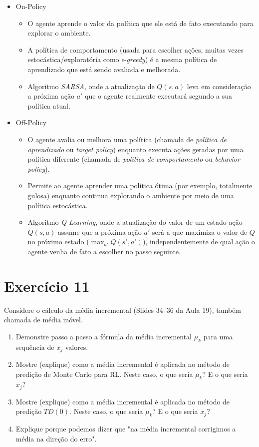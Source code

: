 \documentclass[a4paper,12pt]{article}
\begin{document}
\begin{itemize}
	\item On-Policy 
	\begin{itemize}
		\item O agente aprende o valor da política que ele está de fato executando para explorar o ambiente.
		\item A política de comportamento (usada para escolher ações, muitas vezes estocástica/exploratória como $\epsilon$-\textit{greedy}) é a mesma política de aprendizado que está sendo avaliada e melhorada.
		\item Algoritmo \textit{SARSA}, onde a atualização de $Q(s,a)$ leva em consideração a próxima ação $a'$ que o agente realmente executará segundo a sua política atual.
	\end{itemize}
	
	\item Off-Policy
	\begin{itemize}
		\item O agente avalia ou melhora uma política (chamada de \textit{política de aprendizado} ou \textit{target policy}) enquanto executa ações geradas por uma política diferente (chamada de \textit{política de comportamento} ou \textit{behavior policy}).
		\item Permite ao agente aprender uma política ótima (por exemplo, totalmente gulosa) enquanto continua explorando o ambiente por meio de uma política estocástica.
		\item Algoritmo \textit{Q-Learning}, onde a atualização do valor de um estado-ação $Q(s,a)$ assume que a próxima ação $a'$ será a que maximiza o valor de $Q$ no próximo estado ($\max_{a'} Q(s', a')$), independentemente de qual ação o agente venha de fato a escolher no passo seguinte.
	\end{itemize}
\end{itemize}

\section*{Exercício 11}


Considere o cálculo da média incremental (Slides 34--36 da Aula 19), também chamada de média móvel.
\begin{enumerate}
	\item[\textbf{a.}] Demonstre passo a passo a fórmula da média incremental $\mu_k$ para uma sequência de $x_j$ valores.
	\item[\textbf{b.}] Mostre (explique) como a média incremental é aplicada no método de predição de Monte Carlo para RL. Neste caso, o que seria $\mu_k$? E o que seria $x_j$?
	\item[\textbf{c.}] Mostre (explique) como a média incremental é aplicada no método de predição $TD(0)$. Neste caso, o que seria $\mu_k$? E o que seria $x_j$?
	\item[\textbf{d.}] Explique porque podemos dizer que "na média incremental corrigimos a média na direção do erro".
\end{enumerate}
\end{document}
